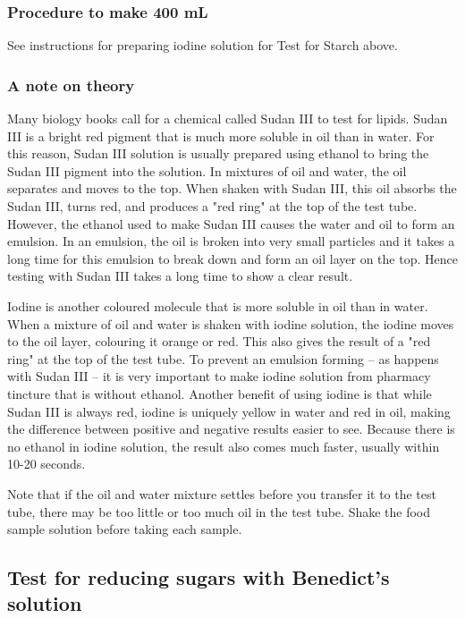 \subsubsection{Procedure to make 400 mL}
See instructions for preparing iodine solution for Test for Starch above.

\subsubsection{A note on theory}

Many biology books call for a chemical called Sudan III to test for lipids. Sudan III is a bright red pigment that is much more soluble in oil than in water. For this reason, Sudan III solution is usually prepared using ethanol to bring the Sudan III pigment into the solution. In mixtures of oil and water, the oil separates and moves to the top. When shaken with Sudan III, this oil absorbs the Sudan III, turns red, and produces a "red ring" at the top of the test tube. However, the ethanol used to make Sudan III causes the water and oil to form an emulsion. In an emulsion, the oil is broken into very small particles and it takes a long time for this emulsion to break down and form an oil layer on the top. Hence testing with Sudan III takes a long time to show a clear result.

Iodine is another coloured molecule that is more soluble in oil than in water. When a mixture of oil and water is shaken with iodine solution, the iodine moves to the oil layer, colouring it orange or red. This also gives the result of a "red ring" at the top of the test tube. To prevent an emulsion forming -- as happens with Sudan III -- it is very important to make iodine solution from pharmacy tincture that is without ethanol. Another benefit of using iodine is that while Sudan III is always red, iodine is uniquely yellow in water and red in oil, making the difference between positive and negative results easier to see. Because there is no ethanol in iodine solution, the result also comes much faster, usually within 10-20 seconds.

Note that if the oil and water mixture settles before you transfer it to the test tube, there may be too little or too much oil in the test tube. Shake the food sample solution before taking each sample.

\subsection{Test for reducing sugars with Benedict's solution}

